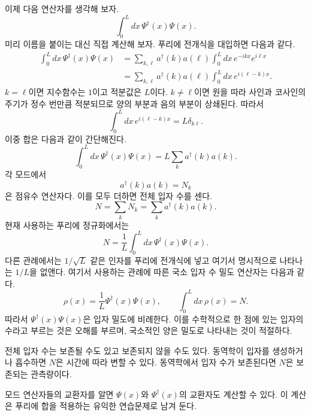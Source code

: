 이제 다음 연산자를 생각해 보자.
\begin{equation}
\int_0^L dx\,\Psi^\dagger(x)\Psi(x).
\end{equation}
미리 이름을 붙이는 대신 직접 계산해 보자. 푸리에 전개식을 대입하면 다음과 같다.
\begin{align}
\int_0^L dx\,\Psi^\dagger(x)\Psi(x)
&=
\sum_{k,\ell}a^\dagger(k)a(\ell)
\int_0^L dx\,e^{-ikx}e^{i\ell x}
\\
&=
\sum_{k,\ell}a^\dagger(k)a(\ell)
\int_0^L dx\,e^{i(\ell-k)x}.
\end{align}
\(k=\ell\)이면 지수함수는 \(1\)이고 적분값은 \(L\)이다. \(k\ne\ell\)이면 원을 따라 사인과 코사인의 주기가 정수 번만큼 적분되므로 양의 부분과 음의 부분이 상쇄된다. 따라서
\begin{equation}
\int_0^L dx\,e^{i(\ell-k)x}=L\delta_{k\ell}.
\end{equation}
이중 합은 다음과 같이 간단해진다.
\begin{equation}
\int_0^L dx\,\Psi^\dagger(x)\Psi(x)
=L\sum_k a^\dagger(k)a(k).
\end{equation}
각 모드에서
\begin{equation}
a^\dagger(k)a(k)=N_k
\end{equation}
은 점유수 연산자다. 이를 모두 더하면 전체 입자 수를 센다.
\begin{equation}
N=\sum_k N_k=\sum_k a^\dagger(k)a(k).
\end{equation}
현재 사용하는 푸리에 정규화에서는
\begin{equation}
N=\frac{1}{L}\int_0^L dx\,
\Psi^\dagger(x)\Psi(x).
\end{equation}
다른 관례에서는 \(1/\sqrt{L}\) 같은 인자를 푸리에 전개식에 넣고 여기서 명시적으로 나타나는 \(1/L\)을 없앤다. 여기서 사용하는 관례에 따른 국소 입자 수 밀도 연산자는 다음과 같다.
\begin{equation}
\rho(x)=\frac{1}{L}\Psi^\dagger(x)\Psi(x),
\qquad
\int_0^L dx\,\rho(x)=N.
\end{equation}
따라서 \(\Psi^\dagger(x)\Psi(x)\)은 입자 밀도에 비례한다. 이를 수학적으로 한 점에 있는 입자의 수라고 부르는 것은 오해를 부르며, 국소적인 양은 밀도로 나타내는 것이 적절하다.

전체 입자 수는 보존될 수도 있고 보존되지 않을 수도 있다. 동역학이 입자를 생성하거나 흡수하면 \(N\)은 시간에 따라 변할 수 있다. 동역학에서 입자 수가 보존된다면 \(N\)은 보존되는 관측량이다.

모드 연산자들의 교환자를 알면 \(\Psi(x)\)와 \(\Psi^\dagger(x)\)의 교환자도 계산할 수 있다. 이 계산은 푸리에 합을 적용하는 유익한 연습문제로 남겨 둔다.

